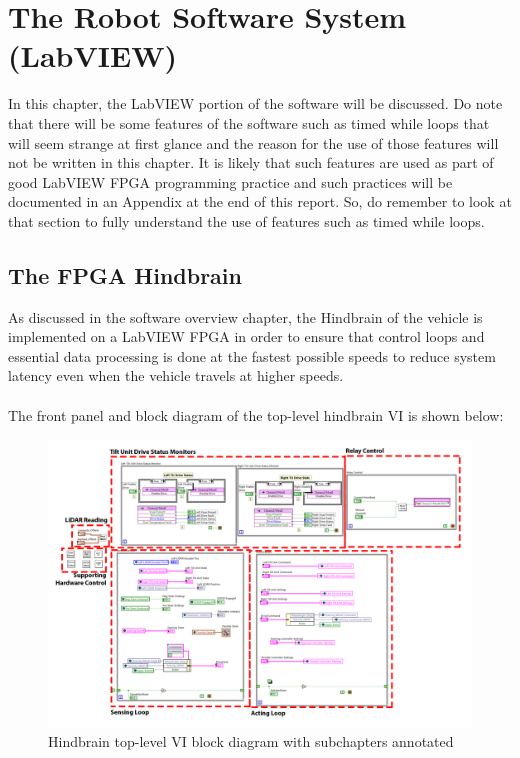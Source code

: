 \chapter{The Robot Software System (LabVIEW)}

In this chapter, the LabVIEW portion of the software will be discussed. Do note that there will be some features of the software such as timed while loops that will seem strange at first glance and the reason for the use of those features will not be written in this chapter. It is likely that such features are used as part of good LabVIEW FPGA programming practice and such practices will be documented in an Appendix at the end of this report. So, do remember to look at that section to fully understand the use of features such as timed while loops.

\section{The FPGA Hindbrain}
As discussed in the software overview chapter, the Hindbrain of the vehicle is implemented on a LabVIEW FPGA in order to ensure that control loops and essential data processing is done at the fastest possible speeds to reduce system latency even when the vehicle travels at higher speeds. \\ \\
%
The front panel and block diagram of the top-level hindbrain VI is shown below:

\begin{figure}[h!]
\centering
\includegraphics[scale=0.55]{Photos/hindbrainblock_annotated.png}
\caption{Hindbrain top-level VI block diagram with subchapters annotated}
\label{fig:hindbrainblock}
\end{figure} 

